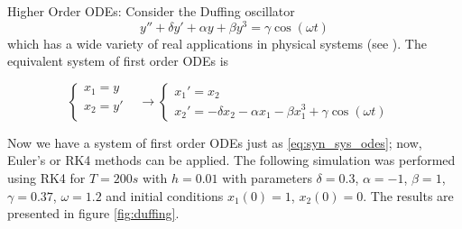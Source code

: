     
    \begin{exmp} Higher Order ODEs: Consider the Duffing oscillator
    \begin{equation}
        y''+\delta y'+\alpha y+\beta y^{3}=\gamma \cos (\omega t)
    \end{equation}
    which has a wide variety of real applications in physical systems (see \cite{Korsch2008}). The equivalent system of first order ODEs is
    
    
    \begin{equation}
        \begin{cases}
        x_1 = y&\\
        x_2 = y'&\\
    \end{cases}\longrightarrow
    \begin{cases}
        x_1'=x_2&\\
        x_2'=-\delta x_2-\alpha x_1-\beta x_1^3 + \gamma\cos(\omega t)
    \end{cases}
    \end{equation}
    \end{exmp}
    
    Now we have a system of first order ODEs just as \ref{eq:syn_sys_odes}; now, Euler's or RK4 methods can be applied. The following simulation was performed using RK4 for $T=200s$ with $h=0.01$ with parameters $\delta=0.3$, $\alpha =-1$, $\beta=1$,$\gamma=0.37$, $\omega =1.2$ and initial conditions $x_1(0)=1$,  $x_2(0)=0$. The results are presented in figure \ref{fig:duffing}.
    
